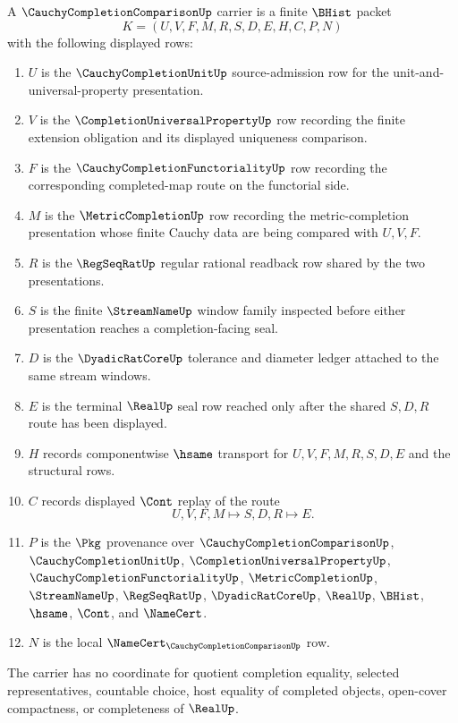 \begin{definition}
\label{def:cauchy-completion-comparison-carrier}
A $\CauchyCompletionComparisonUp$ carrier is a finite $\BHist$ packet
$$
K=(U,V,F,M,R,S,D,E,H,C,P,N)
$$
with the following displayed rows:
\begin{enumerate}
\item $U$ is the $\CauchyCompletionUnitUp$ source-admission row for the unit-and-universal-property presentation.
\item $V$ is the $\CompletionUniversalPropertyUp$ row recording the finite extension obligation and its displayed uniqueness comparison.
\item $F$ is the $\CauchyCompletionFunctorialityUp$ row recording the corresponding completed-map route on the functorial side.
\item $M$ is the $\MetricCompletionUp$ row recording the metric-completion presentation whose finite Cauchy data are being compared with $U,V,F$.
\item $R$ is the $\RegSeqRatUp$ regular rational readback row shared by the two presentations.
\item $S$ is the finite $\StreamNameUp$ window family inspected before either presentation reaches a completion-facing seal.
\item $D$ is the $\DyadicRatCoreUp$ tolerance and diameter ledger attached to the same stream windows.
\item $E$ is the terminal $\RealUp$ seal row reached only after the shared $S,D,R$ route has been displayed.
\item $H$ records componentwise $\hsame$ transport for $U,V,F,M,R,S,D,E$ and the structural rows.
\item $C$ records displayed $\Cont$ replay of the route
$$
U,V,F,M\longmapsto S,D,R\longmapsto E .
$$
\item $P$ is the $\Pkg$ provenance over $\CauchyCompletionComparisonUp$, $\CauchyCompletionUnitUp$, $\CompletionUniversalPropertyUp$, $\CauchyCompletionFunctorialityUp$, $\MetricCompletionUp$, $\StreamNameUp$, $\RegSeqRatUp$, $\DyadicRatCoreUp$, $\RealUp$, $\BHist$, $\hsame$, $\Cont$, and $\NameCert$.
\item $N$ is the local $\NameCert_{\CauchyCompletionComparisonUp}$ row.
\end{enumerate}
The carrier has no coordinate for quotient completion equality, selected representatives, countable choice, host equality of completed objects, open-cover compactness, or completeness of $\RealUp$.
\end{definition}

